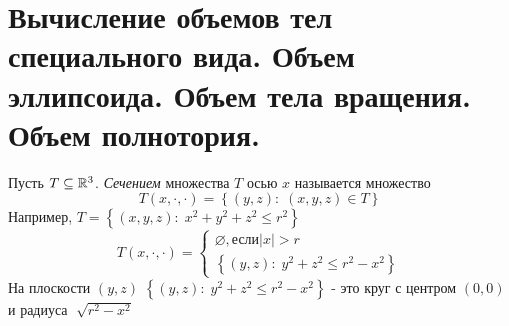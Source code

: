 \documentclass[../main.tex]{subfiles}
\begin{document}
\newpage
\section{Вычисление объемов тел специального вида. Объем эллипсоида. Объем тела вращения. Объем полнотория.}
Пусть \( T \subseteq   \mathbb{R} ^3\). \emph{Сечением} множества \( T\) осью \( x\) называется множество 
\[ T\left( x, \cdot, \cdot\right)=\left\{ \left( y,z\right):\; \left( x,y,z\right) \in T\right\}\]
Например, \( T=\left\{ \left( x,y,z\right):\;x^2+y^2+z^2 \leq r^2\right\}\)
\begin{equation*}
    T\left( x,\cdot,\cdot\right)=
    \begin{cases}
        \varnothing ,\text{если} \left| x\right|>r\\
        \left\{ \left( y,z\right):\;y^2+z^2 \leq r^2-x^2\right\}
    \end{cases}    
\end{equation*}
На плоскости \( \left( y,z\right)\)   \( \left\{ \left( y,z\right):\;y^2+z^2 \leq r^2-x^2\right\}\) - это круг с центром \( \left( 0,0\right)\) и радиуса \( \sqrt[]{r^2-x^2}\)
\end{document}
